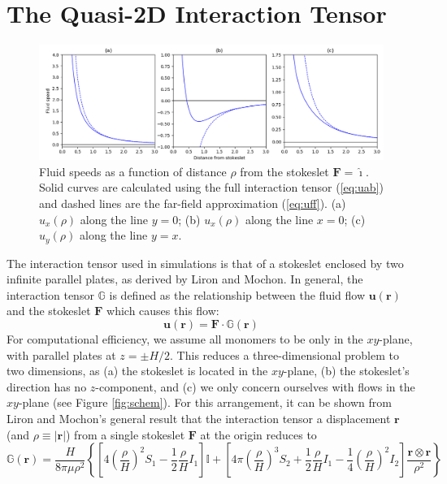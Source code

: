 \documentclass[11pt]{ucthesis}
\begin{document}

\section{The Quasi-2D Interaction Tensor}
\label{app:2Dint}
\begin{figure}
\begin{center}
\includegraphics[width=\textwidth]{Sec2}
\caption{Fluid speeds as a function of distance $\rho$ from the stokeslet $\mathbf{F} = \hat \imath$. Solid curves are calculated using the full interaction tensor (\ref{eq:uab}) and dashed lines are the far-field approximation (\ref{eq:uff}). (a) $u_x(\rho)$ along the line $y=0$; (b) $u_x(\rho)$ along the line $x=0$; (c) $u_y(\rho)$ along the line $y=x$. \label{fig:oseen}}
\end{center}
\end{figure}
The interaction tensor used in simulations is that of a stokeslet enclosed by two infinite parallel plates, as derived by Liron and Mochon\cite{Liron1976}. In general, the interaction tensor $\mathbb{G}$ is defined as the relationship between the fluid flow $\mathbf{u(r)}$ and the stokeslet $\mathbf{F}$ which causes this flow:
\begin{equation}
\label{eq:oseen}
\mathbf{u(r)} = \mathbf{F}\cdot\mathbb{G}(\mathbf{r})
\end{equation}
For computational efficiency, we assume all monomers to be only in
the $xy$-plane, with parallel plates at $z = \pm H/2$. This reduces
a three-dimensional problem to two dimensions, as (a) the stokeslet
is located in the $xy$-plane, (b) the stokeslet's direction has no
$z$-component, and (c) we only concern ourselves with flows in the
$xy$-plane (see Figure \ref{fig:schem}). For
this arrangement, it can be shown from Liron and Mochon's general
result that the interaction tensor a displacement $\mathbf{r}$ (and
$\rho\equiv|\mathbf{r}|$) from a single stokeslet $\mathbf{F}$ at
the origin reduces to
\begin{equation}
\label{eq:uab}
\mathbb{G}(\mathbf{r}) = \frac{H}{8\pi\mu\rho^2}\left\{\left[4\left(\frac\rho H\right)^2 S_1 - \frac12\frac\rho H I_1\right]\mathbb{I}+\left[4\pi\left(\frac{\rho}{H}\right)^3 S_2 + \frac{1}{2}\frac\rho H I_1 -\frac14\left(\frac\rho H\right)^2 I_2\right]\frac{\mathbf{r\otimes r}}{\rho^2}\right\}
\end{equation}
\end{document}
